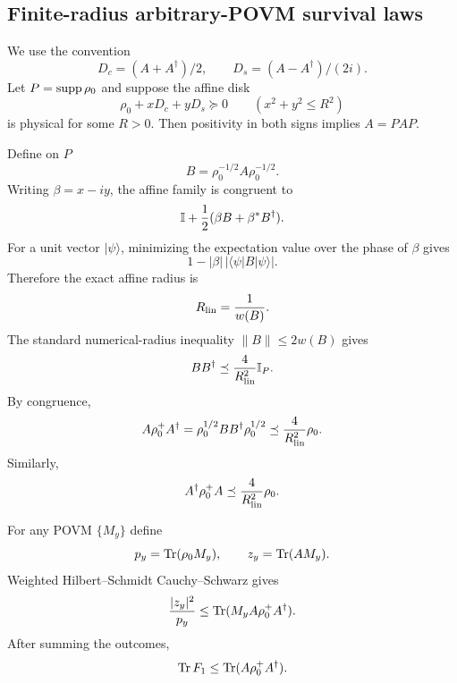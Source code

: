 
\subsection{Finite-radius arbitrary-POVM survival laws}
\label{supp:finite-radius-full}

We use the convention
\begin{equation}
D_c=(A+A^\dagger)/2,
\qquad
D_s=(A-A^\dagger)/(2i).
\end{equation}
Let $P=\operatorname{supp}\rho_0$ and suppose the affine disk
\begin{equation}
\rho_0+xD_c+yD_s\succeq0
\qquad(x^2+y^2\le R^2)
\end{equation}
is physical for some $R>0$. Then positivity in both signs implies $A=PAP$.

Define on $P$
\begin{equation}
B=\rho_0^{-1/2}A\rho_0^{-1/2}.
\end{equation}
Writing $\beta=x-iy$, the affine family is congruent to
\begin{equation}
\mathbb I+\frac12(\beta B+\beta^*B^\dagger).
\end{equation}
For a unit vector $|\psi\rangle$, minimizing the expectation value over the phase of $\beta$ gives
\begin{equation}
1-|\beta|\,|\langle\psi|B|\psi\rangle|.
\end{equation}
Therefore the exact affine radius is
\begin{equation}
R_{\rm lin}=\frac1{w(B)}.
\label{eq:proof-Rlin}
\end{equation}
The standard numerical-radius inequality $\|B\|\le2w(B)$ gives
\begin{equation}
B B^\dagger\preceq\frac4{R_{\rm lin}^2}\mathbb I_P.
\end{equation}
By congruence,
\begin{equation}
A\rho_0^+A^\dagger
=\rho_0^{1/2}BB^\dagger\rho_0^{1/2}
\preceq\frac4{R_{\rm lin}^2}\rho_0.
\label{eq:proof-operator-majorization}
\end{equation}
Similarly,
\begin{equation}
A^\dagger\rho_0^+A
\preceq\frac4{R_{\rm lin}^2}\rho_0.
\end{equation}

For any POVM $\{M_y\}$ define
\begin{equation}
p_y=\operatorname{Tr}(\rho_0M_y),
\qquad
z_y=\operatorname{Tr}(AM_y).
\end{equation}
Weighted Hilbert--Schmidt Cauchy--Schwarz gives
\begin{equation}
\frac{|z_y|^2}{p_y}
\le\operatorname{Tr}(M_yA\rho_0^+A^\dagger).
\end{equation}
After summing the outcomes,
\begin{equation}
\operatorname{Tr} F_1
\le\operatorname{Tr}(A\rho_0^+A^\dagger).
\label{eq:proof-score-bound}
\end{equation}

